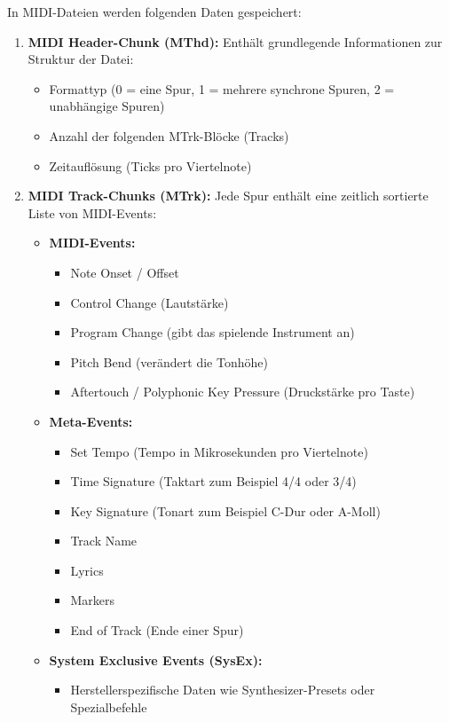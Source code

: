 In MIDI-Dateien werden folgenden Daten gespeichert:
\begin{enumerate}
    \item \textbf{MIDI Header-Chunk (MThd):} Enthält grundlegende Informationen zur Struktur der Datei:
    \begin{itemize}
        \item Formattyp (0 = eine Spur, 1 = mehrere synchrone Spuren, 2 = unabhängige Spuren)
        \item Anzahl der folgenden MTrk-Blöcke (Tracks)
        \item Zeitauflösung (Ticks pro Viertelnote)
    \end{itemize}

    \item \textbf{MIDI Track-Chunks (MTrk):} Jede Spur enthält eine zeitlich sortierte Liste von MIDI-Events:
    \begin{itemize}
        \item \textbf{MIDI-Events:}
        \begin{itemize}
            \item Note Onset / Offset
            \item Control Change (Lautstärke)
            \item Program Change (gibt das spielende Instrument an)
            \item Pitch Bend (verändert die Tonhöhe)
            \item Aftertouch / Polyphonic Key Pressure (Druckstärke pro Taste)
        \end{itemize}
        \item \textbf{Meta-Events:}
        \begin{itemize}
            \item Set Tempo (Tempo in Mikrosekunden pro Viertelnote)
            \item Time Signature (Taktart zum Beispiel 4/4 oder 3/4)
            \item Key Signature (Tonart zum Beispiel C-Dur oder A-Moll)
            \item Track Name
            \item Lyrics
            \item Markers
            \item End of Track (Ende einer Spur)
        \end{itemize}
        \item \textbf{System Exclusive Events (SysEx):}
        \begin{itemize}
            \item Herstellerspezifische Daten wie Synthesizer-Presets oder Spezialbefehle
        \end{itemize}
    \end{itemize}


\end{enumerate}
